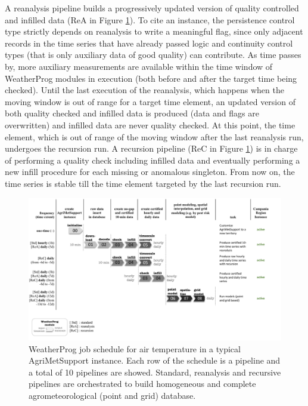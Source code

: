 \documentclass[authoryear,preprint,review,12pt]{elsarticle}
\begin{document}
A reanalysis pipeline builds a progressively updated version of quality controlled and infilled data (ReA in Figure \ref{Fig:weatherprog:calls}).
To cite an instance, the persistence control type strictly depends on reanalysis to write a meaningful flag, since only adjacent records in the time series that have already passed logic and continuity control types (that is only auxiliary data of good quality) can contribute. %
As time passes by, more auxiliary measurements are available within the time window of WeatherProg modules in execution (both before and after the target time being checked). 
Until the last execution of the reanalysis, which happens when the moving window is out of range for a target time element, an updated version of both quality checked and infilled data is produced (data and flags are overwritten) and infilled data are never quality checked.
At this point, the time element, which is out of range of the moving window after the last reanalysis run, undergoes the recursion run.
A recursion pipeline (ReC in Figure \ref{Fig:weatherprog:calls}) is in charge of performing a quality check including infilled data and eventually performing a new infill procedure for each missing or anomalous singleton.
From now on, the time series is stable till the time element targeted by the last recursion run.

\begin{figure}
	\centering
	\includegraphics[scale=.4]{figures/WeatherProg-schedule-fig.pdf}
	\caption{WeatherProg job schedule for air temperature in a typical AgriMetSupport instance.
 Each row of the schedule is a pipeline and a total of 10 pipelines are showed.
 Standard, reanalysis and recursive pipelines are orchestrated to build homogeneous and complete agrometeorological (point and grid) database.}
	\label{Fig:weatherprog:calls}
\end{figure}
\end{document}
